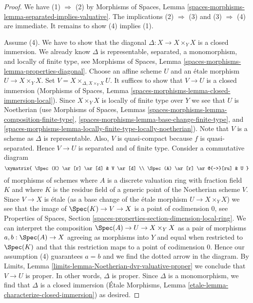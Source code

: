 \begin{proof}
We have (1) $\Rightarrow$ (2) by
Morphisms of Spaces, Lemma
\ref{spaces-morphisms-lemma-separated-implies-valuative}.
The implications (2) $\Rightarrow$ (3) and (3) $\Rightarrow$ (4)
are immediate. It remains to show (4) implies (1).

\medskip\noindent
Assume (4). We have to show that the diagonal
$\Delta : X \to X \times_Y X$ is a closed
immersion. We already know $\Delta$ is representable, separated,
a monomorphism, and locally of finite type, see Morphisms of Spaces, Lemma
\ref{spaces-morphisms-lemma-properties-diagonal}.
Choose an affine scheme $U$ and an \'etale morphism
$U \to X \times_Y X$. Set $V = X \times_{\Delta, X \times_Y X} U$.
It suffices to show that $V \to U$ is a closed immersion (Morphisms of
Spaces, Lemma \ref{spaces-morphisms-lemma-closed-immersion-local}).
Since $X \times_Y X$ is locally of finite type over $Y$ we see that
$U$ is Noetherian (use Morphisms of Spaces, Lemmas
\ref{spaces-morphisms-lemma-composition-finite-type},
\ref{spaces-morphisms-lemma-base-change-finite-type}, and
\ref{spaces-morphisms-lemma-locally-finite-type-locally-noetherian}).
Note that $V$ is a scheme as $\Delta$ is representable.
Also, $V$ is quasi-compact because $f$ is quasi-separated.
Hence $V \to U$ is separated and of finite type. Consider a commutative diagram
$$
\xymatrix{
\Spec(K) \ar[r] \ar[d] & V \ar[d] \\
\Spec(A) \ar[r] \ar@{-->}[ru] & U
}
$$
of morphisms of schemes where $A$ is a discrete valuation ring
with fraction field $K$ and where $K$ is the residue field of
a generic point of the Noetherian scheme $V$. Since $V \to X$
is \'etale (as a base change of the \'etale morphism $U \to X \times_Y X$)
we see that the image of $\Spec(K) \to V \to X$ is a point of
codimension $0$, see Properties of Spaces, Section
\ref{spaces-properties-section-dimension-local-ring}.
We can interpret the composition $\Spec(A) \to U \to X \times_Y X$
as a pair of morphisms $a, b : \Spec(A) \to X$ agreeing as morphisms
into $Y$ and equal when restricted to $\Spec(K)$ and that this
restriction maps to a point of codimension $0$. Hence our assumption
(4) guarantees $a = b$ and we find the dotted arrow in the diagram.
By Limits, Lemma \ref{limits-lemma-Noetherian-dvr-valuative-proper}
we conclude that $V \to U$ is proper. In other words, $\Delta$ is proper.
Since $\Delta$ is a monomorphism, we find that $\Delta$ is a
closed immersion (\'Etale Morphisms, Lemma
\ref{etale-lemma-characterize-closed-immersion}) as desired.
\end{proof}

